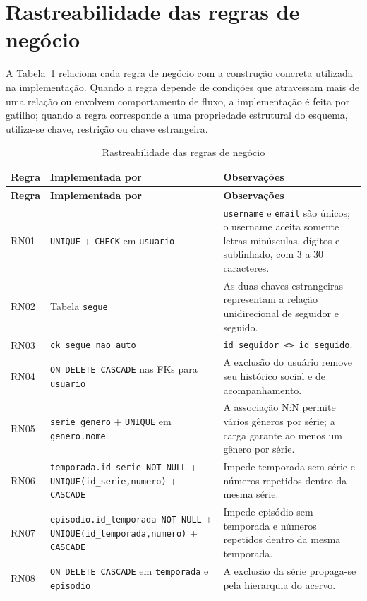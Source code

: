 \documentclass[a4paper,12pt,oneside,openany]{book}
\newcommand{\id}[1]{\texttt{#1}}
\begin{document}
\section{Rastreabilidade das regras de negócio}\label{sec:rastreabilidade}

A Tabela~\ref{tab:rastreabilidade} relaciona cada regra de negócio com a
construção concreta utilizada na implementação. Quando a regra depende de
condições que atravessam mais de uma relação ou envolvem comportamento de fluxo,
a implementação é feita por gatilho; quando a regra corresponde a uma
propriedade estrutural do esquema, utiliza-se chave, restrição ou chave
estrangeira.

\begin{longtable}{@{}p{1.6cm}p{5.2cm}p{9cm}@{}}
\caption{Rastreabilidade das regras de negócio}\label{tab:rastreabilidade}\\
\toprule
\textbf{Regra} & \textbf{Implementada por} & \textbf{Observações} \\
\midrule
\endfirsthead
\toprule
\textbf{Regra} & \textbf{Implementada por} & \textbf{Observações} \\
\midrule
\endhead
RN01 & \id{UNIQUE} + \id{CHECK} em \id{usuario} & \id{username} e \id{email} são únicos; o username aceita somente letras minúsculas, dígitos e sublinhado, com 3 a 30 caracteres. \\
RN02 & Tabela \id{segue} & As duas chaves estrangeiras representam a relação unidirecional de seguidor e seguido. \\
RN03 & \id{ck\_segue\_nao\_auto} & \id{id\_seguidor <> id\_seguido}. \\
RN04 & \id{ON DELETE CASCADE} nas FKs para \id{usuario} & A exclusão do usuário remove seu histórico social e de acompanhamento. \\
RN05 & \id{serie\_genero} + \id{UNIQUE} em \id{genero.nome} & A associação N:N permite vários gêneros por série; a carga garante ao menos um gênero por série. \\
RN06 & \id{temporada.id\_serie NOT NULL} + \id{UNIQUE(id\_serie,numero)} + \id{CASCADE} & Impede temporada sem série e números repetidos dentro da mesma série. \\
RN07 & \id{episodio.id\_temporada NOT NULL} + \id{UNIQUE(id\_temporada,numero)} + \id{CASCADE} & Impede episódio sem temporada e números repetidos dentro da mesma temporada. \\
RN08 & \id{ON DELETE CASCADE} em \id{temporada} e \id{episodio} & A exclusão da série propaga-se pela hierarquia do acervo. \\

\end{longtable}
\end{document}
